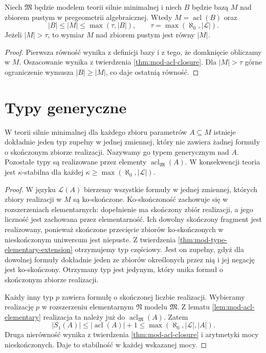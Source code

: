 \begin{wniosek}
\label{cor:mod-strong-minimal-dimension-cardinality}
Niech $\mathfrak M$ będzie modelem teorii
silnie minimalnej i niech $B$ będzie bazą $M$
nad zbiorem pustym w pregeometrii algebraicznej.
Wtedy $M=\operatorname{acl}(B)$ oraz
\[
|B|\leq |M|\leq\max(\tau,|B|),
\qquad \tau=\max(\aleph_0,|\mathcal L|).
\]
Jeżeli $|M|>\tau$, to wymiar $M$ nad zbiorem
pustym jest równy $|M|$.
\end{wniosek}
\begin{proof}
Pierwsza równość wynika z definicji bazy
i z tego, że domknięcie obliczamy w $M$.
Oszacowanie wynika z twierdzenia
\ref{thm:mod-acl-closure}.
Dla $|M|>\tau$ górne ograniczenie wymusza
$|B|\geq |M|$, co daje ostatnią równość.
\end{proof}

\section{Typy generyczne}

\begin{twierdzenie}
\label{thm:mod-strong-minimal-generic}
W teorii silnie minimalnej dla każdego zbioru
parametrów $A\subseteq M$ istnieje dokładnie
jeden typ zupełny w jednej zmiennej,
który nie zawiera żadnej formuły o skończonym
zbiorze realizacji. Nazywamy go typem generycznym
nad $A$. Pozostałe typy są realizowane przez
elementy $\operatorname{acl}_{\mathfrak M}(A)$.
W konsekwencji teoria jest $\kappa$-stabilna
dla każdej $\kappa\geq\max(\aleph_0,|\mathcal L|)$.
\end{twierdzenie}
\begin{proof}
W języku $\mathcal L(A)$ bierzemy wszystkie
formuły w jednej zmiennej, których zbiory
realizacji w $M$ są ko-skończone.
Ko-skończoność zachowuje się w rozszerzeniach
elementarnych: dopełnienie ma skończony zbiór
realizacji, a jego liczność jest zachowana
przez elementarność.
Ich dowolny skończony fragment jest realizowany,
ponieważ skończone przecięcie zbiorów
ko-skończonych w nieskończonym uniwersum
jest niepuste. Z twierdzenia
\ref{thm:mod-type-elementary-extension}
otrzymujemy typ częściowy. Jest on zupełny,
gdyż dla dowolnej formuły dokładnie jeden
ze zbiorów określonych przez nią i jej negację
jest ko-skończony. Otrzymany typ jest jedynym,
który unika formuł o skończonym zbiorze realizacji.

Każdy inny typ $p$ zawiera formułę o skończonej
liczbie realizacji. Wybieramy realizację $p$
w rozszerzeniu elementarnym $\mathfrak N$
modelu $\mathfrak M$. Z lematu
\ref{lem:mod-acl-elementary} realizacja ta
należy już do $\operatorname{acl}_{\mathfrak M}(A)$.
Zatem
\[
|S_1(A)|\leq |\operatorname{acl}(A)|+1
\leq \max(\aleph_0,|\mathcal L|,|A|).
\]
Druga nierówność wynika z twierdzenia
\ref{thm:mod-acl-closure} i arytmetyki
mocy nieskończonych. Daje to stabilność
w każdej wskazanej mocy.
\end{proof}

